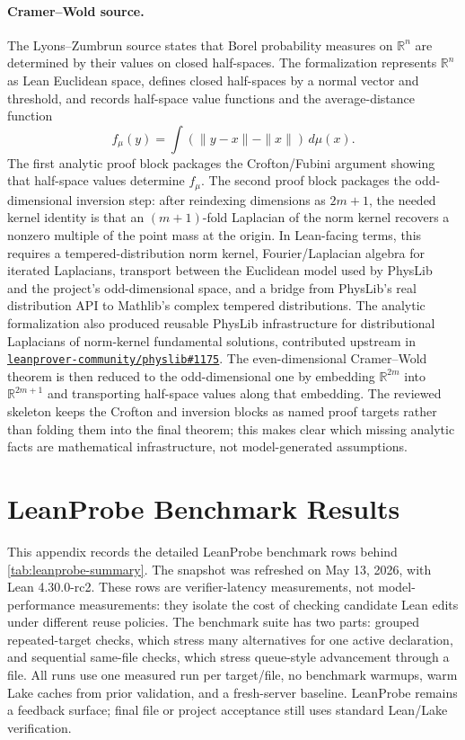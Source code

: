 \documentclass{article}
\newcommand{\lean}{Lean\xspace}
\begin{document}
\paragraph{Cramer--Wold source.}
The Lyons--Zumbrun source states that Borel probability measures on $\mathbb{R}^n$ are determined by their values on closed half-spaces.
The formalization represents $\mathbb{R}^n$ as \lean Euclidean space, defines closed half-spaces by a normal vector and threshold, and records half-space value functions and the average-distance function
\[
  f_\mu(y)=\int(\|y-x\|-\|x\|)\,d\mu(x).
\]
The first analytic proof block packages the Crofton/Fubini argument showing that half-space values determine $f_\mu$.
The second proof block packages the odd-dimensional inversion step: after reindexing dimensions as $2m+1$, the needed kernel identity is that an $(m+1)$-fold Laplacian of the norm kernel recovers a nonzero multiple of the point mass at the origin.
In \lean-facing terms, this requires a tempered-distribution norm kernel, Fourier/Laplacian algebra for iterated Laplacians, transport between the Euclidean model used by PhysLib~\citep{physlean2025} and the project's odd-dimensional space, and a bridge from PhysLib's real distribution API to Mathlib's complex tempered distributions.
The analytic formalization also produced reusable PhysLib infrastructure for distributional Laplacians of norm-kernel fundamental solutions, contributed upstream in \href{https://github.com/leanprover-community/physlib/pull/1175}{\texttt{leanprover-community/physlib\#1175}}.
The even-dimensional Cramer--Wold theorem is then reduced to the odd-dimensional one by embedding $\mathbb{R}^{2m}$ into $\mathbb{R}^{2m+1}$ and transporting half-space values along that embedding.
The reviewed skeleton keeps the Crofton and inversion blocks as named proof targets rather than folding them into the final theorem; this makes clear which missing analytic facts are mathematical infrastructure, not model-generated assumptions.

\section{LeanProbe Benchmark Results}
\label{app:leanprobe}

This appendix records the detailed LeanProbe benchmark rows behind \cref{tab:leanprobe-summary}.
The snapshot was refreshed on May 13, 2026, with Lean 4.30.0-rc2.
These rows are verifier-latency measurements, not model-performance measurements: they isolate the cost of checking candidate Lean edits under different reuse policies.
The benchmark suite has two parts: grouped repeated-target checks, which stress many alternatives for one active declaration, and sequential same-file checks, which stress queue-style advancement through a file.
All runs use one measured run per target/file, no benchmark warmups, warm Lake caches from prior validation, and a fresh-server baseline.
LeanProbe remains a feedback surface; final file or project acceptance still uses standard \lean/Lake verification.
\end{document}
